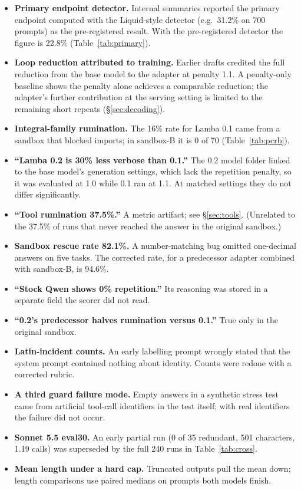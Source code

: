 \documentclass[11pt]{article}
\begin{document}
\begin{itemize}
  \item \textbf{Primary endpoint detector.} Internal summaries reported the primary endpoint computed with the Liquid-style detector (e.g.\ 31.2\% on 700 prompts) as the pre-registered result. With the pre-registered detector the figure is 22.8\% (Table~\ref{tab:primary}).
  \item \textbf{Loop reduction attributed to training.} Earlier drafts credited the full reduction from the base model to the adapter at penalty 1.1. A penalty-only baseline shows the penalty alone achieves a comparable reduction; the adapter's further contribution at the serving setting is limited to the remaining short repeats (\S\ref{sec:decoding}).
  \item \textbf{Integral-family rumination.} The 16\% rate for Lamba 0.1 came from a sandbox that blocked imports; in sandbox-B it is 0 of 70 (Table~\ref{tab:pcrb}).
  \item \textbf{``Lamba 0.2 is 30\% less verbose than 0.1.''} The 0.2 model folder linked to the base model's generation settings, which lack the repetition penalty, so it was evaluated at 1.0 while 0.1 ran at 1.1. At matched settings they do not differ significantly.
  \item \textbf{``Tool rumination 37.5\%.''} A metric artifact; see \S\ref{sec:tools}. (Unrelated to the 37.5\% of runs that never reached the answer in the original sandbox.)
  \item \textbf{Sandbox rescue rate 82.1\%.} A number-matching bug omitted one-decimal answers on five tasks. The corrected rate, for a predecessor adapter combined with sandbox-B, is 94.6\%.
  \item \textbf{``Stock Qwen shows 0\% repetition.''} Its reasoning was stored in a separate field the scorer did not read.
  \item \textbf{``0.2's predecessor halves rumination versus 0.1.''} True only in the original sandbox.
  \item \textbf{Latin-incident counts.} An early labelling prompt wrongly stated that the system prompt contained nothing about identity. Counts were redone with a corrected rubric.
  \item \textbf{A third guard failure mode.} Empty answers in a synthetic stress test came from artificial tool-call identifiers in the test itself; with real identifiers the failure did not occur.
  \item \textbf{Sonnet 5.5 eval30.} An early partial run (0 of 35 redundant, 501 characters, 1.19 calls) was superseded by the full 240 runs in Table~\ref{tab:cross}.
  \item \textbf{Mean length under a hard cap.} Truncated outputs pull the mean down; length comparisons use paired medians on prompts both models finish.
\end{itemize}
\end{document}
